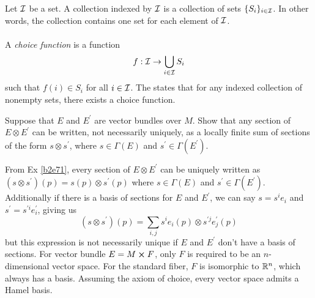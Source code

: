 \documentclass[10pt]{article}
\begin{document}
\begin{definition}
	Let $\mathcal{I}$ be a set. A collection indexed by $\mathcal{I}$ is a collection of sets $\lbrace S_i\rbrace_{i\in \mathcal{I}}$. In other words, the collection contains one set for each element of $\mathcal{I}$.\\\\
	A \emph{choice function} is a function
	$$
	f:\mathcal{I}\to\bigcup_{i\in\mathcal{I}}S_i
	$$
	such that $f(i)\in S_i$ for all $i \in \mathcal{I}$. The  states that for any indexed collection of nonempty sets, there exists a choice function.
\end{definition}


\begin{example}\label{b2e72}
	Suppose that $E$ and $E^\prime$ are vector bundles over $M$. Show that any section of $E \otimes E^\prime$ can be written, not necessarily uniquely, as a locally finite sum of sections of the form $s \otimes s^\prime$, where $s \in \Gamma(E)$ and $s^\prime \in \Gamma(E^\prime)$.
\end{example}
\sol From Ex \ref{b2e71}, every section of $E \otimes E^\prime$ can be uniquely written as $(s \otimes s^\prime)(p) = s(p) \otimes s^\prime(p)$ where $s \in \Gamma(E)$ and $s^\prime \in \Gamma(E^\prime)$. Additionally if there is a basis of sections for $E$ and $E^\prime$, we can say $s = s^ie_i$ and $s^\prime = s^{\prime i}e_i^\prime$, giving us
$$
(s \otimes s^\prime)(p) = \sum_{i,j}s^ie_i(p) \otimes s^{\prime j}e_j^\prime(p)
$$
but this expression is not necessarily unique if $E$ and $E^\prime$ don't have a basis of sections. For vector bundle $E = M \cross F$, only $F$ is required to be an $n$-dimensional vector space. For the standard fiber, $F$ is isomorphic to $\mathbb{R}^n$, which always has a basis. Assuming the axiom of choice, every vector space admits a Hamel basis.
\end{document}

